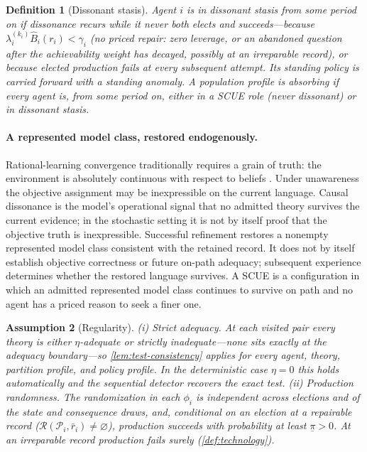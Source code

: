 \documentclass[11pt]{article}
\newtheorem{assumption}{Assumption}[section]
\newtheorem{definition}[assumption]{Definition}
\theoremstyle{definition}
\newcommand{\emptysetset}{\varnothing}
\begin{document}
\begin{definition}[Dissonant stasis]
\label{def:stasis}
Agent $i$ is in \emph{dissonant stasis} from some period on if dissonance recurs while it never both elects and succeeds---because $\lambda_i^{(k_i)}\widehat B_i(r_i)<\gamma_i$ (no priced repair: zero leverage, or an abandoned question after the achievability weight has decayed, possibly at an irreparable record), or because elected production fails at every subsequent attempt.
Its standing policy is carried forward with a standing anomaly.
A population profile is \emph{absorbing} if every agent is, from some period on, either in a SCUE role (never dissonant) or in dissonant stasis.
\end{definition}

\paragraph{A represented model class, restored endogenously.}
\label{rem:grain}
Rational-learning convergence traditionally requires a grain of truth: the environment is absolutely continuous with respect to beliefs \citep{KalaiLehrer1993a}.
Under unawareness the objective assignment may be inexpressible on the current language.
Causal dissonance is the model's operational signal that no admitted theory survives the current evidence; in the stochastic setting it is not by itself proof that the objective truth is inexpressible.
Successful refinement restores a nonempty represented model class consistent with the retained record.
It does not by itself establish objective correctness or future on-path adequacy; subsequent experience determines whether the restored language survives.
A SCUE is a configuration in which an admitted represented model class continues to survive on path and no agent has a priced reason to seek a finer one.

\begin{assumption}[Regularity]
\label{ass:regularity}
(i) \emph{Strict adequacy.}
At each visited pair every theory is either $\eta$-adequate or strictly inadequate---none sits exactly at the adequacy boundary---so \cref{lem:test-consistency} applies for every agent, theory, partition profile, and policy profile.
In the deterministic case $\eta=0$ this holds automatically and the sequential detector recovers the exact test.
(ii) \emph{Production randomness.}
The randomization in each $\phi_i$ is independent across elections and of the state and consequence draws, and, conditional on an election at a \emph{repairable} record ($\mathcal R(\mathcal P_i,\bar r_i)\neq\emptysetset$), production succeeds with probability at least $\underline\pi>0$.
At an irreparable record production fails surely (\cref{def:technology}).
\end{assumption}
\end{document}
